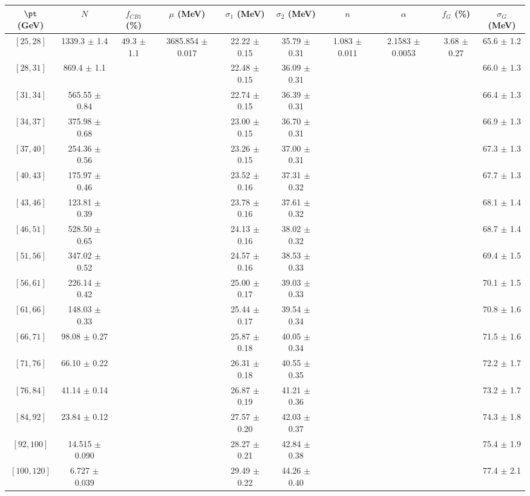 \begin{tabular}{c||c|c|c|c|c|c|c|c|c}
$\pt$ (GeV) & $N$ & $f_{CB1}$ (\%)  & $\mu$ (MeV) & $\sigma_1$ (MeV) & $\sigma_2$ (MeV) & $n$ & $\alpha$ & $f_G$ (\%) & $\sigma_G$ (MeV) \\
\hline
$[25, 28]$ & 1339.3 $\pm$ 1.4 & \multirow{17}{*}{49.3 $\pm$ 1.1} & \multirow{17}{*}{3685.854 $\pm$ 0.017} & 22.22 $\pm$ 0.15 & 35.79 $\pm$ 0.31 & \multirow{17}{*}{1.083 $\pm$ 0.011} & \multirow{17}{*}{2.1583 $\pm$ 0.0053} & \multirow{17}{*}{3.68 $\pm$ 0.27} & 65.6 $\pm$ 1.2\\
$[28, 31]$ & 869.4 $\pm$ 1.1 &  &  & 22.48 $\pm$ 0.15 & 36.09 $\pm$ 0.31 &  &  &  & 66.0 $\pm$ 1.3\\
$[31, 34]$ & 565.55 $\pm$ 0.84 &  &  & 22.74 $\pm$ 0.15 & 36.39 $\pm$ 0.31 &  &  &  & 66.4 $\pm$ 1.3\\
$[34, 37]$ & 375.98 $\pm$ 0.68 &  &  & 23.00 $\pm$ 0.15 & 36.70 $\pm$ 0.31 &  &  &  & 66.9 $\pm$ 1.3\\
$[37, 40]$ & 254.36 $\pm$ 0.56 &  &  & 23.26 $\pm$ 0.15 & 37.00 $\pm$ 0.31 &  &  &  & 67.3 $\pm$ 1.3\\
$[40, 43]$ & 175.97 $\pm$ 0.46 &  &  & 23.52 $\pm$ 0.16 & 37.31 $\pm$ 0.32 &  &  &  & 67.7 $\pm$ 1.3\\
$[43, 46]$ & 123.81 $\pm$ 0.39 &  &  & 23.78 $\pm$ 0.16 & 37.61 $\pm$ 0.32 &  &  &  & 68.1 $\pm$ 1.4\\
$[46, 51]$ & 528.50 $\pm$ 0.65 &  &  & 24.13 $\pm$ 0.16 & 38.02 $\pm$ 0.32 &  &  &  & 68.7 $\pm$ 1.4\\
$[51, 56]$ & 347.02 $\pm$ 0.52 &  &  & 24.57 $\pm$ 0.16 & 38.53 $\pm$ 0.33 &  &  &  & 69.4 $\pm$ 1.5\\
$[56, 61]$ & 226.14 $\pm$ 0.42 &  &  & 25.00 $\pm$ 0.17 & 39.03 $\pm$ 0.33 &  &  &  & 70.1 $\pm$ 1.5\\
$[61, 66]$ & 148.03 $\pm$ 0.33 &  &  & 25.44 $\pm$ 0.17 & 39.54 $\pm$ 0.34 &  &  &  & 70.8 $\pm$ 1.6\\
$[66, 71]$ & 98.08 $\pm$ 0.27 &  &  & 25.87 $\pm$ 0.18 & 40.05 $\pm$ 0.34 &  &  &  & 71.5 $\pm$ 1.6\\
$[71, 76]$ & 66.10 $\pm$ 0.22 &  &  & 26.31 $\pm$ 0.18 & 40.55 $\pm$ 0.35 &  &  &  & 72.2 $\pm$ 1.7\\
$[76, 84]$ & 41.14 $\pm$ 0.14 &  &  & 26.87 $\pm$ 0.19 & 41.21 $\pm$ 0.36 &  &  &  & 73.2 $\pm$ 1.7\\
$[84, 92]$ & 23.84 $\pm$ 0.12 &  &  & 27.57 $\pm$ 0.20 & 42.03 $\pm$ 0.37 &  &  &  & 74.3 $\pm$ 1.8\\
$[92, 100]$ & 14.515 $\pm$ 0.090 &  &  & 28.27 $\pm$ 0.21 & 42.84 $\pm$ 0.38 &  &  &  & 75.4 $\pm$ 1.9\\
$[100, 120]$ & 6.727 $\pm$ 0.039 &  &  & 29.49 $\pm$ 0.22 & 44.26 $\pm$ 0.40 &  &  &  & 77.4 $\pm$ 2.1\\
\end{tabular}
